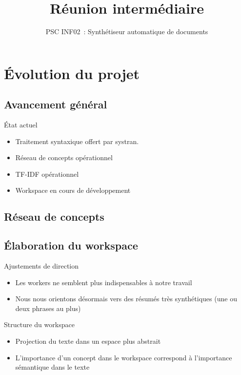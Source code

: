 \documentclass{beamer}
\title{Réunion intermédiaire}
\subtitle{PSC INF02~: Synthétiseur automatique de documents}
\author{}
\institute{École polytechnique}
\date{}
\begin{document}
\beamertemplatenavigationsymbolsempty{}
\beamerdefaultoverlayspecification{<+->}
\begin{frame}
  \titlepage{}
\end{frame}

\section{Évolution du projet}
\subsection{Avancement général}

\begin{frame}
  \begin{block}{État actuel}
    \begin{itemize}
      \item Traitement syntaxique offert par systran.
      \item Réseau de concepts opérationnel
      \item TF-IDF opérationnel
      \item Workspace en cours de développement
    \end{itemize}
  \end{block}
\end{frame}

\subsection{Réseau de concepts}
\begin{frame}

\end{frame}

\subsection{Élaboration du workspace}
\begin{frame}
  \begin{block}{Ajustements de direction}
    \begin{itemize}
      \item Les workers ne semblent plus indispensables à notre travail
      \item Nous nous orientons désormais vers des résumés très synthétiques (une ou deux phrases au plus)
    \end{itemize}
  \end{block}

  \begin{block}{Structure du workspace}
   \begin{itemize}
     \item Projection du texte dans un espace plus abstrait
     \item L'importance d'un concept dans le workspace correspond à l'importance sémantique dans le texte
   \end{itemize} 
  \end{block}
\end{frame}
\end{document}
